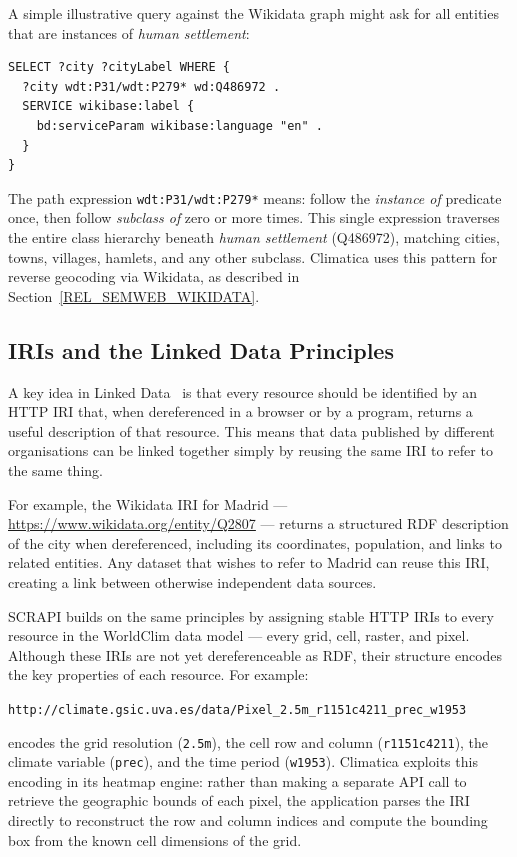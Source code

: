 A simple illustrative query against the Wikidata graph might ask for
all entities
that are instances of \emph{human settlement}:

\begin{lstlisting}[language=SPARQL, caption={A SPARQL query over the Wikidata
  graph retrieving all instances of human settlement.},
  label={lst:sparql_basic}]
SELECT ?city ?cityLabel WHERE {
  ?city wdt:P31/wdt:P279* wd:Q486972 .
  SERVICE wikibase:label {
    bd:serviceParam wikibase:language "en" .
  }
}
\end{lstlisting}

The path expression \texttt{wdt:P31/wdt:P279*} means: follow the \emph{instance
of} predicate once, then follow \emph{subclass of} zero or more times. This
single expression traverses the entire class hierarchy beneath \emph{human
settlement} (Q486972), matching cities, towns, villages, hamlets, and any other
subclass. Climatica uses this pattern for reverse geocoding via Wikidata, as
described in Section~\ref{REL_SEMWEB_WIKIDATA}.

\subsection{IRIs and the Linked Data Principles}\label{REL_SEMWEB_LD}

A key idea in Linked Data~\cite{linkeddata} is that every resource should be
identified by an HTTP IRI that, when dereferenced in a browser or by a program,
returns a useful description of that resource. This means that data published by
different organisations can be linked together simply by reusing the same IRI to
refer to the same thing.

For example, the Wikidata IRI for Madrid ---
\url{https://www.wikidata.org/entity/Q2807} --- returns a structured RDF
description of the city when dereferenced, including its coordinates, population,
and links to related entities. Any dataset that wishes to refer to Madrid can
reuse this IRI, creating a link between otherwise independent data sources.

SCRAPI builds on the same principles by assigning stable HTTP IRIs to every
resource in the WorldClim data model --- every grid, cell, raster, and pixel.
Although these IRIs are not yet dereferenceable as RDF, their structure encodes
the key properties of each resource. For example:
\begin{center}
  \texttt{http://climate.gsic.uva.es/data/Pixel\_2.5m\_r1151c4211\_prec\_w1953}
\end{center}
encodes the grid resolution (\texttt{2.5m}), the cell row and column
(\texttt{r1151c4211}), the climate variable (\texttt{prec}), and the time
period (\texttt{w1953}). Climatica exploits this encoding in its heatmap
engine: rather than making a separate API call to retrieve the geographic bounds
of each pixel, the application parses the IRI directly to reconstruct the row
and column indices and compute the bounding box from the known cell dimensions
of the grid.

